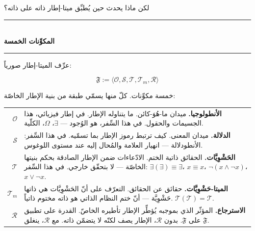 \documentclass[10pt, openany, oneside]{book}
\renewcommand{\normalsize}{\fontsize{10}{13}\selectfont}
\renewcommand{\footnotesize}{\fontsize{8.5}{11}\selectfont}
\begin{document}
لكن ماذا يحدث حين يُطبِّق ميتا-إطار ذاته على ذاته؟

\vspace{1.5em}


\begin{center}
    \rule{0.3\textwidth}{0.4pt}\\[0.5em]
    {\normalsize\bfseries المكوِّنات الخمسة}\\[0.3em]
    \rule{0.3\textwidth}{0.4pt}
\end{center}

\vspace{1em}

\noindent عرِّف الميتا-إطار صورياً:

$$\mathfrak{F} := \langle \mathcal{O}, \mathcal{S}, \mathcal{T}, \mathcal{T}_m, \mathcal{R} \rangle$$

خمسة مكوِّنات. كلّ منها يسمّي طبقة من بنية الإطار الخاصّة:

\vspace{0.5em}

{\footnotesize
\noindent\begin{tabular}{r p{}}
$\mathcal{O}$ & \textbf{الأنطولوجيا.} ميدان ما-هُوَ-كائن. ما يتناوله الإطار. في إطار فيزيائي، هذا الجسيمات والحقول. في هذا السِّفر، هو الوُجود --- $\exists$، $\Omega$، الكلّية. \\[0.3em]
$\mathcal{S}$ & \textbf{الدلالة.} ميدان المعنى. كيف ترتبط رموز الإطار بما تسمّيه. في هذا السِّفر: الأنطودلالة --- انهيار العلامة والمُحال إليه عند مستوى اللوغوس. \\[0.3em]
$\mathcal{T}$ & \textbf{الحَشْوِيَّات.} الحقائق ذاتية الختم. الادّعاءات ضمن الإطار الصادقة بحكم بنيتها الخاصّة --- لا بتحقّق خارجي. في هذا السِّفر: $\exists(\exists) \equiv \exists$، $x \equiv x$، $\neg(x \wedge \neg x)$، $x \vee \neg x$. \\[0.3em]
$\mathcal{T}_m$ & \textbf{الميتا-حَشْوِيَّات.} حقائق عن الحقائق. التعرّف على أنّ الحَشْوِيَّات هي ذاتها حَشْوِيَّة --- أنّ ختم النظام الذاتي هو ذاته مختوم ذاتياً. $\mathcal{T}(\mathcal{T}) = \mathcal{T}$. \\[0.3em]
$\mathcal{R}$ & \textbf{الاسترجاع.} المؤثّر الذي بموجبه يُؤطِّر الإطار تأطيره الخاصّ. القدرة على تطبيق $\mathfrak{F}$ على $\mathfrak{F}$. بدون $\mathcal{R}$، الإطار يصف لكنّه لا يتضمّن ذاته. مع $\mathcal{R}$، ينغلق. \\[0.3em]
\end{tabular}
}
\end{document}
